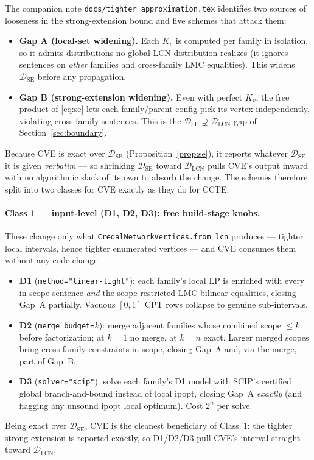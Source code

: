 \documentclass[11pt]{article}
\newcommand{\DSE}{\mathcal{D}_{\mathrm{SE}}}
\newcommand{\DLCN}{\mathcal{D}_{\mathrm{LCN}}}
\begin{document}
The companion note \texttt{docs/tighter\_approximation.tex} identifies two sources of looseness in
the strong-extension bound and five schemes that attack them:
\begin{itemize}
  \item \textbf{Gap A (local-set widening).} Each $K_v$ is computed per family in isolation, so it
    admits distributions no global LCN distribution realizes (it ignores sentences on \emph{other}
    families and cross-family LMC equalities). This widens $\DSE$ before any propagation.
  \item \textbf{Gap B (strong-extension widening).} Even with perfect $K_v$, the free product of
    \eqref{eq:se} lets each family/parent-config pick its vertex independently, violating
    cross-family sentences. This is the $\DSE\supsetneq\DLCN$ gap of Section~\ref{sec:boundary}.
\end{itemize}
Because CVE is exact over $\DSE$ (Proposition~\ref{prop:se}), it reports whatever $\DSE$ it is
given \emph{verbatim} --- so shrinking $\DSE$ toward $\DLCN$ pulls CVE's output inward with no
algorithmic slack of its own to absorb the change. The schemes therefore split into two classes for
CVE exactly as they do for CCTE.

\paragraph{Class 1 --- input-level (D1, D2, D3): free build-stage knobs.} These change only what
\texttt{CredalNetworkVertices.from\_lcn} produces --- tighter local intervals, hence tighter
enumerated vertices --- and CVE consumes them without any code change.
\begin{itemize}
  \item \textbf{D1} (\texttt{method="linear-tight"}): each family's local LP is enriched with every
    in-scope sentence \emph{and} the scope-restricted LMC bilinear equalities, closing Gap~A
    partially. Vacuous $[0,1]$ CPT rows collapse to genuine sub-intervals.
  \item \textbf{D2} (\texttt{merge\_budget=$k$}): merge adjacent families whose combined scope
    $\le k$ before factorization; at $k=1$ no merge, at $k=n$ exact. Larger merged scopes bring
    cross-family constraints in-scope, closing Gap~A and, via the merge, part of Gap~B.
  \item \textbf{D3} (\texttt{solver="scip"}): solve each family's D1 model with SCIP's certified
    global branch-and-bound instead of local ipopt, closing Gap~A \emph{exactly} (and flagging any
    unsound ipopt local optimum). Cost $2^n$ per solve.
\end{itemize}
Being exact over $\DSE$, CVE is the cleanest beneficiary of Class~1: the tighter strong extension is
reported exactly, so D1/D2/D3 pull CVE's interval straight toward $\DLCN$.
\end{document}
